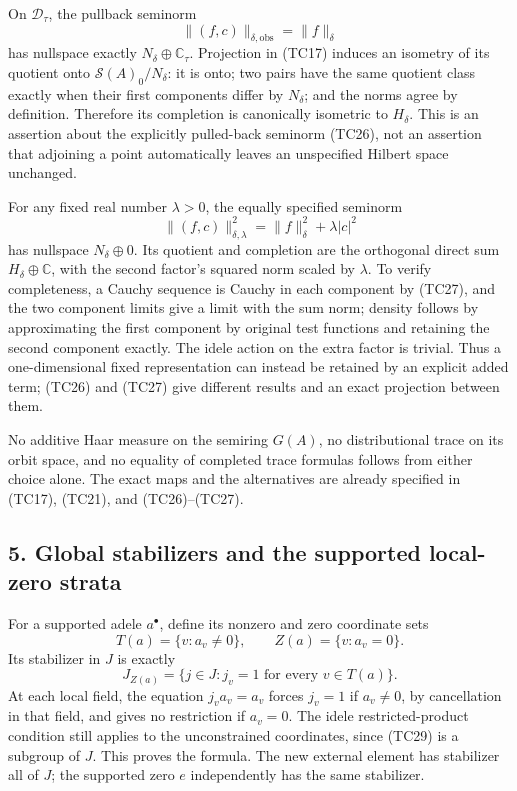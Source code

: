 \documentclass[
  10pt,
]{article}
\begin{document}
On \(\mathcal D_\tau\), the pullback seminorm \[
\|(f,c)\|_{\delta,\mathrm{obs}}=\|f\|_\delta
\tag{TC26}
\] has nullspace exactly \(N_\delta\oplus\mathbb C_\tau\). Projection in
(TC17) induces an isometry of its quotient onto
\(\mathcal S(A)_0/N_\delta\): it is onto; two pairs have the same
quotient class exactly when their first components differ by
\(N_\delta\); and the norms agree by definition. Therefore its
completion is canonically isometric to \(H_\delta\). This is an
assertion about the explicitly pulled-back seminorm (TC26), not an
assertion that adjoining a point automatically leaves an unspecified
Hilbert space unchanged.

For any fixed real number \(\lambda>0\), the equally specified seminorm
\[
\|(f,c)\|_{\delta,\lambda}^2
=\|f\|_\delta^2+\lambda|c|^2
\tag{TC27}
\] has nullspace \(N_\delta\oplus0\). Its quotient and completion are
the orthogonal direct sum \(H_\delta\oplus\mathbb C\), with the second
factor's squared norm scaled by \(\lambda\). To verify completeness, a
Cauchy sequence is Cauchy in each component by (TC27), and the two
component limits give a limit with the sum norm; density follows by
approximating the first component by original test functions and
retaining the second component exactly. The idele action on the extra
factor is trivial. Thus a one-dimensional fixed representation can
instead be retained by an explicit added term; (TC26) and (TC27) give
different results and an exact projection between them.

No additive Haar measure on the semiring \(G(A)\), no distributional
trace on its orbit space, and no equality of completed trace formulas
follows from either choice alone. The exact maps and the alternatives
are already specified in (TC17), (TC21), and (TC26)--(TC27).

\subsection{5. Global stabilizers and the supported local-zero
strata}\label{global-stabilizers-and-the-supported-local-zero-strata}

For a supported adele \(a^\bullet\), define its nonzero and zero
coordinate sets \[
T(a)=\{v:a_v\ne0\},\qquad Z(a)=\{v:a_v=0\}.
\tag{TC28}
\] Its stabilizer in \(J\) is exactly \[
J_{Z(a)}=\{j\in J:j_v=1\text{ for every }v\in T(a)\}.
\tag{TC29}
\] At each local field, the equation \(j_va_v=a_v\) forces \(j_v=1\) if
\(a_v\ne0\), by cancellation in that field, and gives no restriction if
\(a_v=0\). The idele restricted-product condition still applies to the
unconstrained coordinates, since (TC29) is a subgroup of \(J\). This
proves the formula. The new external element has stabilizer all of
\(J\); the supported zero \(e\) independently has the same stabilizer.
\end{document}
